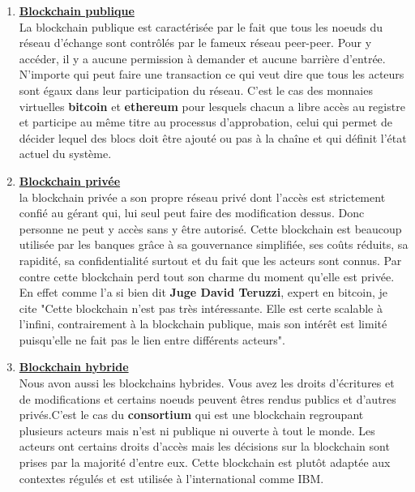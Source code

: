 \documentclass[12pt]{report}
\begin{document}
\begin{enumerate}

    \item \underline{\textbf{Blockchain publique}}\\ [0.3cm]
La blockchain publique est caractérisée par le fait que tous les noeuds du réseau d'échange sont contrôlés par le fameux réseau peer-peer. Pour y accéder, il y a aucune permission à demander et aucune barrière d'entrée. N'importe qui peut faire une transaction ce qui veut dire que tous les acteurs sont égaux dans leur participation du réseau. C'est le cas des monnaies virtuelles \textbf{bitcoin} et \textbf{ethereum} pour lesquels chacun a libre accès au registre et participe au même titre au processus d'approbation, celui qui permet de décider lequel des blocs doit être ajouté ou pas à la chaîne et qui définit l'état actuel du système.\\ 

\newpage
    \item \underline{\textbf{Blockchain privée}}\\[0.3cm]
la blockchain privée a son propre réseau privé dont l'accès est strictement confié au gérant qui, lui seul peut faire des modification dessus. Donc personne ne peut y accès sans y être autorisé. Cette blockchain est beaucoup utilisée par les banques grâce à sa gouvernance simplifiée, ses coûts réduits, sa rapidité, sa confidentialité surtout et du fait que les acteurs sont connus. Par contre cette blockchain perd tout son charme du moment qu'elle est privée. En effet comme l'a si bien dit \textbf{Juge David Teruzzi}, expert en bitcoin, je cite "Cette blockchain n'est pas très intéressante. Elle est certe scalable à l'infini, contrairement à la blockchain publique, mais son intérêt est limité puisqu'elle ne fait pas le lien entre différents acteurs". 

    \item \underline{\textbf{Blockchain hybride}}\\[0.3cm]
Nous avon aussi les blockchains hybrides. Vous avez les droits d'écritures et de  modifications et certains noeuds peuvent êtres rendus publics et d'autres privés.C'est le cas du \textbf{consortium} qui est une blockchain regroupant plusieurs acteurs mais n'est ni publique ni ouverte à tout le monde. Les acteurs ont certains droits d'accès mais les décisions sur la blockchain sont prises par la majorité d'entre eux. Cette blockchain est plutôt adaptée aux contextes régulés et est utilisée à l'international comme IBM.\\

\end{enumerate}
\end{document}
